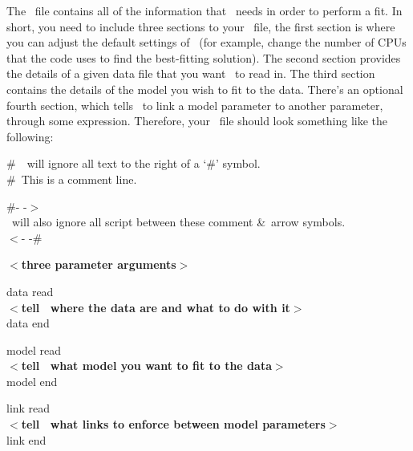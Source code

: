 The \dmod\ file contains all of the information that \alis\ needs in order
to perform a fit. In short, you need to include three sections to your
\dmod\ file, the first section is where you can adjust the default settings
of \alis\ (for example, change the number of CPUs that the code uses
to find the best-fitting solution). The second section provides the details
of a given data file that you want \alis\ to read in. The third section contains
the details of the model you wish to fit to the data. There's an optional fourth
section, which tells \alis\ to link a model parameter to another parameter,
through some expression. Therefore, your \dmod\ file should look something
like the following:

\vspace{0.3cm}
\begin{mdframed}[style=MyFrame]
\#\ \alis\ will ignore all text to the right of a `\#' symbol.\\
\#\ This is a comment line.\\

\vspace{0.1cm}

\noindent
\#- -$>$\\
\alis\ will also ignore all script between these
comment \&\ arrow symbols.\\
$<$- -\#\\

\vspace{0.1cm}

\noindent
{\bfseries $<$three parameter arguments$>$}\\

\vspace{0.1cm}

\noindent
data read\\
{\bfseries $<$tell \alis\ where the data are and what to do with it$>$}\\
data end\\

\vspace{0.1cm}

\noindent
model read\\
{\bfseries $<$tell \alis\ what model you want to fit to the data$>$}\\
model end\\

\vspace{0.1cm}

\noindent
link read\\
{\bfseries $<$tell \alis\ what links to enforce between model parameters$>$}\\
link end
\end{mdframed}
\vspace{0.2cm}

